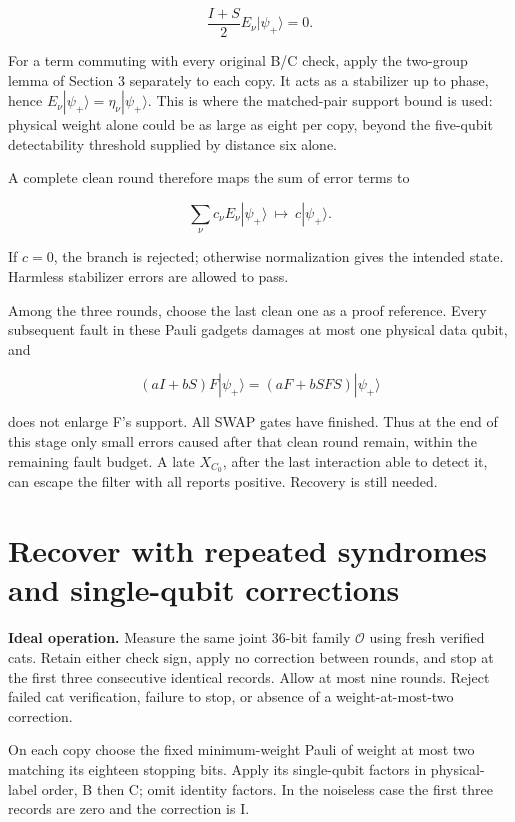 \documentclass[11pt]{article}
\begin{document}
\[
\frac{I+S}{2}E_\nu|\psi_+\rangle=0.
\]

For a term commuting with every original B/C check, apply the two-group lemma of Section 3 separately to each copy. It acts as a stabilizer up to phase, hence \(E_\nu|\psi_+\rangle=\eta_\nu|\psi_+\rangle\). This is where the matched-pair support bound is used: physical weight alone could be as large as eight per copy, beyond the five-qubit detectability threshold supplied by distance six alone.

A complete clean round therefore maps the sum of error terms to

\[
\sum_\nu c_\nu E_\nu|\psi_+\rangle\ \longmapsto\ c|\psi_+\rangle.
\]

If \(c=0\), the branch is rejected; otherwise normalization gives the intended state. Harmless stabilizer errors are allowed to pass.

Among the three rounds, choose the last clean one as a proof reference. Every subsequent fault in these Pauli gadgets damages at most one physical data qubit, and

\[
(aI+bS)F|\psi_+\rangle=(aF+bSFS)|\psi_+\rangle
\]

does not enlarge F's support. All SWAP gates have finished. Thus at the end of this stage only small errors caused after that clean round remain, within the remaining fault budget. A late \(X_{C_0}\), after the last interaction able to detect it, can escape the filter with all reports positive. Recovery is still needed.

\section{Recover with repeated syndromes and single-qubit corrections}
\textbf{Ideal operation.} Measure the same joint 36-bit family \(\mathcal O\) using fresh verified cats. Retain either check sign, apply no correction between rounds, and stop at the first three consecutive identical records. Allow at most nine rounds. Reject failed cat verification, failure to stop, or absence of a weight-at-most-two correction.

On each copy choose the fixed minimum-weight Pauli of weight at most two matching its eighteen stopping bits. Apply its single-qubit factors in physical-label order, B then C; omit identity factors. In the noiseless case the first three records are zero and the correction is I.

\begin{center}\begin{minipage}{\linewidth}

\end{minipage}\end{center}
\end{document}

